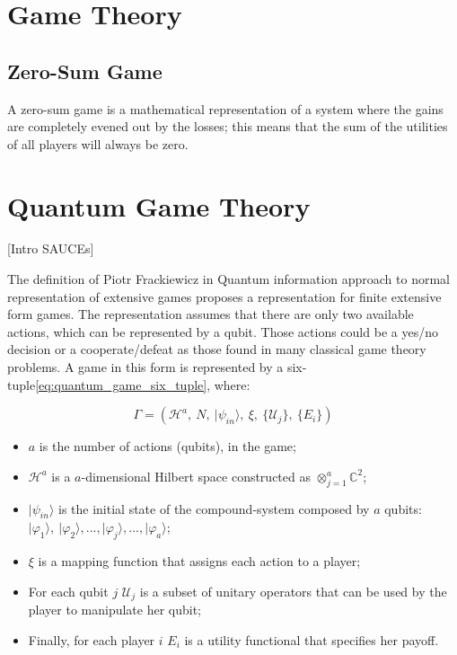 \section{Game Theory}
\label{sec:background:game_theory}

\subsection{Zero-Sum Game}
\label{subsec:background:game_theory_zero_sum_game}

A zero-sum game is a mathematical representation of a system where the gains are completely evened out by the losses; this means that the sum of the utilities of all players will always be zero.


\section{Quantum Game Theory}
\label{sec:background_quantum_game_theory}

[Intro SAUCEs]

The definition of Piotr Frackiewicz in Quantum information approach
to normal representation of extensive games proposes a representation
for finite extensive form games. The representation assumes that there
are only two available actions, which can be represented by a qubit.
Those actions could be a yes/no decision or a cooperate/defeat as
those found in many classical game theory problems. A game in this
form is represented by a six-tuple\ref{eq:quantum_game_six_tuple},
where:

\begin{equation}
\Gamma=(\mathcal{H}^{a},\: N,\:\vert\psi_{in}\rangle,\:\xi,\:\{\mathcal{U}_{j}\},\:\{E_{i}\})\label{eq:quantum_game_six_tuple}
\end{equation}

\begin{itemize}
\item $a$ is the number of actions (qubits), in the game; 
\item $\mathcal{H}^{a}$ is a $a$-dimensional Hilbert space constructed
as $\otimes_{j=1}^{a}\mathbb{C}^{2}$;
\item $\vert\psi_{in}\rangle$ is the initial state of the compound-system
composed by $a$ qubits: $\vert\varphi_{1}\rangle,\:\vert\varphi_{2}\rangle, ..., \vert\varphi_{j}\rangle, ..., \vert\varphi_{a}\rangle$;
\item $\xi$ is a mapping function that assigns each action to a player;
\item For each qubit $j$ $\mathcal{U}_{j}$ is a subset of unitary operators
that can be used by the player to manipulate her qubit;
\item Finally, for each player $i$ $E_{i}$ is a utility functional that
specifies her payoff.\end{itemize}

